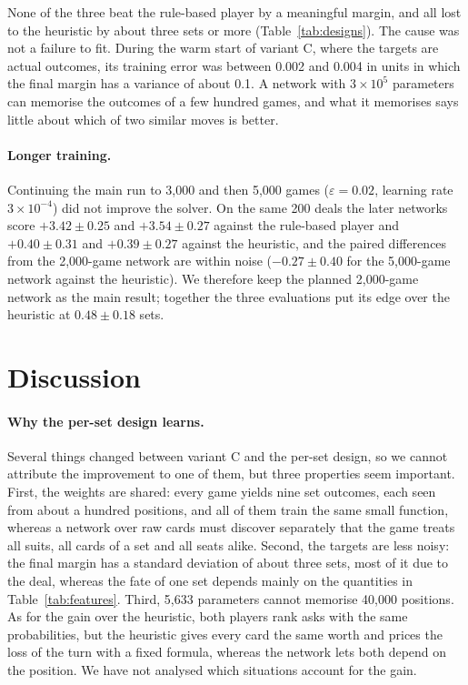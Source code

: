 \documentclass{article}
\begin{document}
None of the three beat the rule-based player by a meaningful margin, and all
lost to the heuristic by about three sets or more (Table~\ref{tab:designs}).
The cause was not a failure to fit.  During the warm start of variant C, where
the targets are actual outcomes, its training error was between 0.002 and
0.004 in units in which the final margin has a variance of about 0.1.  A
network with $3 \times 10^5$ parameters can memorise the outcomes of a few
hundred games, and what it memorises says little about which of two similar
moves is better.

\paragraph{Longer training.}
Continuing the main run to 3,000 and then 5,000 games ($\varepsilon = 0.02$,
learning rate $3 \times 10^{-4}$) did not improve the solver.  On the same 200
deals the later networks score $+3.42 \pm 0.25$ and $+3.54 \pm 0.27$ against
the rule-based player and $+0.40 \pm 0.31$ and $+0.39 \pm 0.27$ against the
heuristic, and the paired differences from the 2,000-game network are within
noise ($-0.27 \pm 0.40$ for the 5,000-game network against the heuristic).  We
therefore keep the planned 2,000-game network as the main result; together the
three evaluations put its edge over the heuristic at $0.48 \pm 0.18$ sets.

\section{Discussion}

\paragraph{Why the per-set design learns.}
Several things changed between variant C and the per-set design, so we cannot
attribute the improvement to one of them, but three properties seem important.
First, the weights are shared: every game yields nine set outcomes, each seen
from about a hundred positions, and all of them train the same small function,
whereas a network over raw cards must discover separately that the game treats
all suits, all cards of a set and all seats alike.  Second, the targets are
less noisy: the final margin has a standard deviation of about three sets, most
of it due to the deal, whereas the fate of one set depends mainly on the
quantities in Table~\ref{tab:features}.  Third, 5,633
parameters cannot memorise 40,000 positions.  As for the gain over the
heuristic, both players rank asks with the same probabilities, but the
heuristic gives every card the same worth and prices the loss of the turn with
a fixed formula, whereas the network lets both depend on the position.  We have
not analysed which situations account for the gain.
\end{document}
